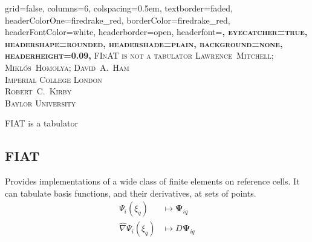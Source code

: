 \documentclass[a0paper,portrait]{baposter}
\begin{document}
\begin{poster}{
    grid=false,
    columns=6,
    colspacing=0.5em,
    textborder=faded,
    headerColorOne=firedrake_red,
    borderColor=firedrake_red,
    headerFontColor=white,
    headerborder=open,
    headerfont=\bfseries\Large\scshape,
    eyecatcher=true,
    headershape=rounded,
    headershade=plain,
    background=none,
    headerheight=0.09\textheight,
  }
  {
  } 
  {\scshape\Large FInAT is not a tabulator}
  {\small\scshape Lawrence~Mitchell; Mikl\'os~Homolya; David~A.~Ham\\[0.1em]Imperial College London
    \\[0.4em]  
    Robert~C.~Kirby\\[0.1em]Baylor University}
  {
  }

  \begin{posterbox}[name=introduction,span=6,column=0,row=0]{FIAT is a
      tabulator}
    \begin{minipage}{0.49\textwidth}
      \subsection*{FIAT}
      \vspace{-0.5em}
      Provides implementations of a wide class of
      finite elements on reference cells. It can tabulate basis
      functions, and their derivatives, at sets of points.
      \vspace{-0.25\baselineskip}
      \begin{align*}
        \Psi_i(\xi_q) &\mapsto \mathbf{\Psi}_{iq}\\
        \hat{\nabla}\Psi_i(\xi_q) &\mapsto D\mathbf{\Psi}_{iq}
      \end{align*}
    \end{minipage}
    \hfill
    \begin{minipage}{0.49\textwidth} 

\end{minipage}
\end{posterbox}
\end{poster}
\end{document}
